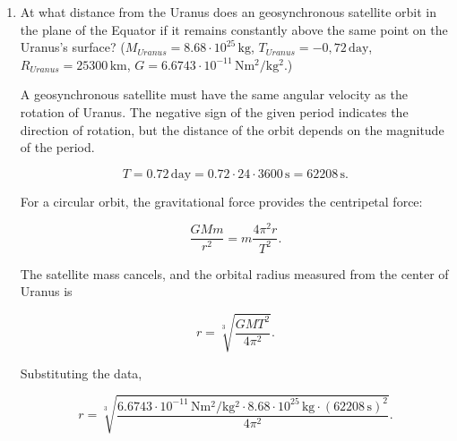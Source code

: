 \documentclass[letterpaper,12pt]{letter}
\begin{document}
\begin{enumerate}[label=\Roman*.]
\begin{enumerate}[label=\arabic*.]
As calculated previously, the total flight time is

$$t_{\mathrm{total}}=17.66\,\mathrm{s}.$$

Therefore,

$$\boxed{t_{\mathrm{total}}=17.66\,\mathrm{s}}.$$


\item At what distance from the Uranus does an geosynchronous satellite orbit in the plane of the Equator if it remains constantly above the same point on the Uranus's surface? ($M_{Uranus}=8.68\cdot 10^{25}\,\mathrm{kg}$, $T_{Uranus}=-0,72 \,\mathrm{day}$, $R_{Uranus}=25300\,\mathrm{km}$, $G=6.6743\cdot 10^{-11}\,\mathrm{Nm^2/kg^2}$.)  

\bigskip

\begin{center}
\end{center}

A geosynchronous satellite must have the same angular velocity as the rotation of Uranus. The negative sign of the given period indicates the direction of rotation, but the distance of the orbit depends on the magnitude of the period.

$$T=0.72\,\mathrm{day}=0.72\cdot24\cdot3600\,\mathrm{s}=62208\,\mathrm{s}.$$

For a circular orbit, the gravitational force provides the centripetal force:

$$\frac{GMm}{r^2}=m\frac{4\pi^2r}{T^2}.$$

The satellite mass cancels, and the orbital radius measured from the center of Uranus is

$$r=\sqrt[3]{\frac{GMT^2}{4\pi^2}}.$$

Substituting the data,

$$r=\sqrt[3]{\frac{6.6743\cdot10^{-11}\,\mathrm{Nm^2/kg^2}\cdot8.68\cdot10^{25}\,\mathrm{kg}\cdot(62208\,\mathrm{s})^2}{4\pi^2}}.$$


\end{enumerate}
\end{enumerate}
\end{document}
